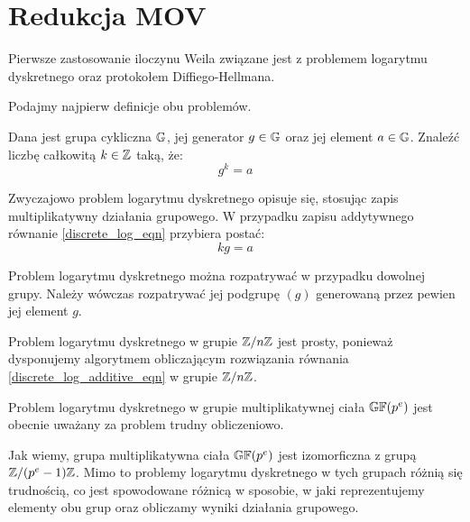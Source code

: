 \section{Redukcja MOV}

Pierwsze zastosowanie iloczynu Weila
związane jest
z problemem logarytmu dyskretnego oraz protokołem Diffiego-Hellmana.

Podajmy najpierw definicje obu problemów.

\begin{problem}
Dana jest grupa cykliczna $\mathbb{G}$,
jej generator $g \in \mathbb{G}$
oraz jej element $a \in \mathbb{G}$.
Znaleźć liczbę całkowitą $k \in \mathbb{Z}$ taką, że:
\begin{equation}\label{discrete_log_eqn}
g^k = a
\end{equation}
\end{problem}

\begin{remark}
Zwyczajowo problem logarytmu dyskretnego opisuje się,
stosując zapis multiplikatywny działania grupowego.
W przypadku zapisu addytywnego równanie \ref{discrete_log_eqn}
przybiera postać:
\begin{equation}\label{discrete_log_additive_eqn}
kg = a
\end{equation}
\end{remark}

\begin{remark}
Problem logarytmu dyskretnego można rozpatrywać w przypadku dowolnej grupy.
Należy wówczas rozpatrywać jej podgrupę $(g)$
generowaną przez pewien jej element $g$.
\end{remark}

\begin{remark}
Problem logarytmu dyskretnego w grupie $\mathbb{Z} / n\mathbb{Z}$ jest prosty,
ponieważ dysponujemy algorytmem obliczającym rozwiązania
równania \ref{discrete_log_additive_eqn} w grupie $\mathbb{Z} / n\mathbb{Z}$.
\end{remark}

\begin{remark}
Problem logarytmu dyskretnego w grupie multiplikatywnej ciała $\mathbb{GF}(p^e)$
jest obecnie uważany za problem trudny obliczeniowo.
\end{remark}

Jak wiemy, grupa multiplikatywna ciała $\mathbb{GF}(p^e)$
jest izomorficzna z grupą $\mathbb{Z} / (p^e-1)\mathbb{Z}$.
Mimo to problemy logarytmu dyskretnego w tych grupach
różnią się trudnością,
co jest spowodowane różnicą w sposobie,
w jaki reprezentujemy elementy obu grup
oraz obliczamy wyniki działania grupowego.

